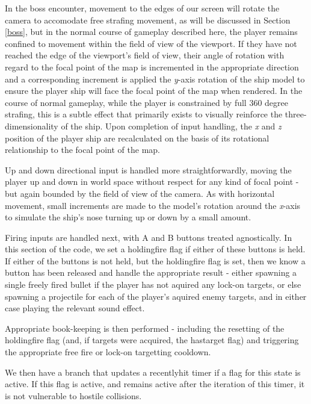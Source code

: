 \documentclass[11pt]{article}
\begin{document}
In the boss encounter, movement to the
edges of our screen will rotate the camera to accomodate free strafing movement, as will be discussed in
Section \ref{boss}, but in the normal course of gameplay described here, the player remains confined to
movement within the field of view of the viewport. If they have not reached the edge of the viewport's
field of view, their angle of rotation with regard to the focal point of the map is incremented in the
appropriate direction and a corresponding increment is applied the \textit{y}-axis rotation of the
ship model to ensure the player ship will face the focal point of the map when rendered. In the course
of normal gameplay, while the player is constrained by full 360 degree strafing, this is a subtle effect
that primarily exists to visually reinforce the three-dimensionality of the ship. Upon completion of
input handling, the \textit{x} and \textit{z} position of the player ship are recalculated on the basis 
of its rotational relationship to the focal point of the map.

Up and down directional input is handled more straightforwardly, moving the player up and down in world
space without respect for any kind of focal point - but again bounded by the field of view of the
camera. As with horizontal movement, small increments are made to the model's rotation around the
\textit{x}-axis to simulate the ship's nose turning up or down by a small amount.

Firing inputs are handled next, with A and B buttons treated agnostically. In this section of the
code, we set a holding\textunderscore fire flag if either of these buttons is held. If either of the
buttons is not held, but the holding\textunderscore fire flag is set, then we know a button has
been released and handle the appropriate result - either spawning a single freely fired bullet
if the player has not aquired any lock-on targets, or else spawning a projectile for each of 
the player's aquired enemy targets, and in either case playing the relevant sound effect.

Appropriate book-keeping is then performed - including the resetting of the holding\textunderscore fire
flag (and, if targets were acquired, the has\textunderscore target flag) and triggering the appropriate
free fire or lock-on targetting cooldown.

We then have a branch that updates a recently\textunderscore hit timer if a flag for this state
is active. If this flag is active, and remains active after the iteration of this timer, it is
not vulnerable to hostile collisions.
\end{document}
